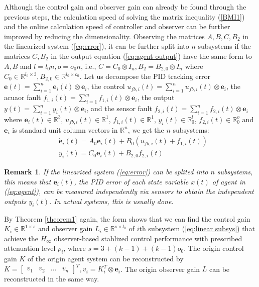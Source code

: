 \documentclass{ieeeaccess}
\newtheorem{remark}{Remark}
\begin{document}
Although the control gain and observer gain can already be found through the previous steps, the calculation speed of solving the matrix inequality (\ref{BMI1}) and the online calculation speed of controller and observer can be further improved by reducing the dimensionality. Observing the matrices $A,B,C,B_2$ in the linearized system (\ref{eq:error}), it can be further split into $n$ subsystems if the matrices $C,B_2$ in the output equation (\ref{eq:agent output}) have the same form to $A,B$ and $l=l_0n, o=o_0n$, i.e., $C = C_0\otimes I_n,B_2 = B_{2,0}\otimes I_n$ where $C_0\in\mathbb{R}^{l_0\times 3},B_{2,0}\in\mathbb{R}^{l_0\times o_0}$. Let us decompose the PID tracking error $\pmb{e}(t)=\sum_{i=1}^{n} \pmb{e}_i(t)\otimes\mathbf{e}_i$, the control $u_{fb,i}(t)=\sum_{i=1}^{n} {u}_{fb,i}(t)\otimes\mathbf{e}_i$, the acuaor fault $f_{1,i}(t)=\sum_{i=1}^{n} {f}_{1,i}(t)\otimes\mathbf{e}_i$, the output $y(t)=\sum_{i=1}^{n} {y}_i(t)\otimes\mathbf{e}_i$, and the sensor fault $f_{2,i}(t)=\sum_{i=1}^{n} {f}_{2,i}(t)\otimes\mathbf{e}_i$ where $\pmb{e}_i(t)\in\mathbb{R}^3$, $u_{fb,i}(t)\in\mathbb{R}^1$, $f_{1,i}(t)\in\mathbb{R}^1$, $y_i(t)\in\mathbb{R}^l_0$, $f_{2,i}(t)\in\mathbb{R}^o_0$ and $\mathbf{e}_i$ is standard unit column vectors in $\mathbb{R}^n$, we get the $n$ subsystems:
\begin{equation} \label{eq:linear subsys}
    \begin{split}
        & \dot{\pmb{e}}_i(t)=A_0\pmb{e}_i(t)+B_0(u_{fb,i}(t)+f_{1,i}(t)) \\
        & {y}_i(t)=C_0\pmb{e}_i(t)+B_{2,0}f_{2,i}(t)   
    \end{split}
\end{equation}
\begin{remark}
    If the linearized system (\ref{eq:error}) can be splited into $n$ subsystems, this means that $\pmb{e}_i(t)$, the PID error of each state variable $x(t)$ of agent in (\ref{eq:agent}), can be measured independently via sensors to obtain the independent outputs $y_i(t)$. In actual systems, this is usually done.
\end{remark}

By Theorem \ref{theorem1} again, the form shows that we can find the control gain $K_i\in\mathbb{R}^{1\times s}$ and observer gain $L_i\in\mathbb{R}^{s\times l_0}$ of $i$th subsystem (\ref{eq:linear subsys}) that achieve the $H_\infty$ observer-based stablized control performance with prescribed attenuation level $\rho_i$, where $s=3+(k-1)+(k-1)o_0$. The origin control gain $K$ of the origin agent system can be reconstructed by $K = \begin{bmatrix}
    \mathit{v}_1 & \mathit{v}_2 & ... & \mathit{v}_n
\end{bmatrix}^T, \mathit{v}_i=K_i^T\otimes\mathbf{e}_i$. The origin observer gain $L$ can be reconstructed in the same way. 
\end{document}
